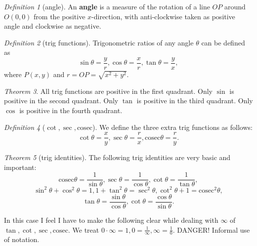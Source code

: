 \documentclass[8pt]{article}
\theoremstyle{remark}
\newtheorem{theorem}{Theorem}[section]
\newtheorem{definition}[theorem]{Definition}
\begin{document}
        \begin{definition}[angle]
            An \textbf{angle} is a measure of the rotation of a line $OP$ around $O(0, 0)$ from the positive $x$-direction, with anti-clockwise taken as positive angle and clockwise as negative.
        \end{definition}

        \begin{definition}[trig functions]
            Trigonometric ratios of any angle $\theta$ can be defined as
            $$
                \sin \theta = \frac{y}{r}, \cos \theta = \frac{x}{r}, \tan \theta = \frac{y}{x},
            $$
            where $P(x, y)$ and $r = OP = \sqrt{x^2 + y^2}$.
        \end{definition}

        \begin{theorem}
            All trig functions are positive in the first quadrant. Only $\sin$ is positive in the second quadrant. Only $\tan$ is positive in the third quadrant. Only $\cos$ is positive in the fourth quadrant.
        \end{theorem}

        \newcommand{\cosec}{\mathrm{cosec}}

        \begin{definition}[$\cot, \sec, \cosec$]
            We define the three extra trig functions as follows:
            $$
                \cot \theta = \frac{x}{y}, \sec \theta = \frac{r}{x}, \cosec \theta = \frac{r}{y}.
            $$
        \end{definition}

        \begin{theorem}[trig identities]
            The following trig identities are very basic and important:
            $$
                \cosec \theta = \frac{1}{\sin \theta}, \sec \theta = \frac{1}{\cos \theta}, \cot \theta = \frac{1}{\tan \theta},
            $$
            $$
                \sin^2 \theta + \cos^2 \theta = 1, 1 + \tan^2 \theta = \sec^2 \theta, \cot^2 \theta + 1 = \cosec^2 \theta,
            $$
            $$
                \tan \theta = \frac{\sin \theta}{\cos \theta}, \cot \theta = \frac{\cos \theta}{\sin \theta}.
            $$

            In this case I feel I have to make the following clear while dealing with $\infty$ of $\tan, \cot, \sec, \cosec$. We treat $0 \cdot \infty = 1, 0 = \frac{1}{\infty}, \infty = \frac{1}{0}$. DANGER! Informal use of notation.
        \end{theorem}
\end{document}
